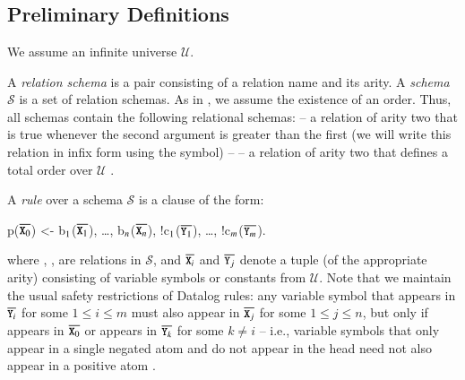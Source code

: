 \section{\large \bf \lang}
\label{sec:foundation}

\subsection{Preliminary Definitions}


We assume an infinite universe $\mathcal{U}$.

A {\em relation schema} is a pair consisting of a relation name and its arity.
A {\em schema} $\mathcal{S}$ is a set of relation schemas.   As in , we assume the existence of an order.  Thus, all schemas contain the following relational schemas:  -- a relation of arity two that is true whenever the second argument is greater than the first (we will write this relation in infix form using the \dedalus{<} symbol) --  -- a relation of arity two that defines a total order over $\mathcal{U}$ .

A {\em rule} over a schema $\mathcal{S}$ is a clause of the form:

\begin{Dedalus}
p(\(\overline{\dedalus{X}\sb{0}}\)) <- b\(\sb{1}\)({\(\overline{\dedalus{X}\sb{1}}\)}), \ldots, b\(\sb{n}\)(\(\overline{\dedalus{X}\sb{n}}\)),
!c\(\sb{1}\)(\(\overline{\dedalus{Y}\sb{1}}\)), \ldots, !c\(\sb{m}\)(\(\overline{\dedalus{Y}\sb{m}}\)).
\end{Dedalus}

where , ,
 are relations in
$\mathcal{S}$, and $\overline{\dedalus{X}_i}$ and $\overline{\dedalus{Y}_j}$
denote a tuple (of the appropriate arity) consisting of variable symbols or
constants from $\mathcal{U}$.  Note that we maintain the usual safety
restrictions of Datalog rules: any variable symbol  that appears in
$\overline{\dedalus{Y}_i}$ for some $1 \leq i \leq m$ must also appear in
$\overline{\dedalus{X}_j}$ for some $1 \leq j \leq n$, but only if 
appears in $\overline{\dedalus{X}_0}$ or  appears in
$\overline{\dedalus{Y}_k}$ for some $k \neq i$ -- i.e., variable symbols that
only appear in a single negated atom and do not appear in the head need not also
appear in a positive atom .

